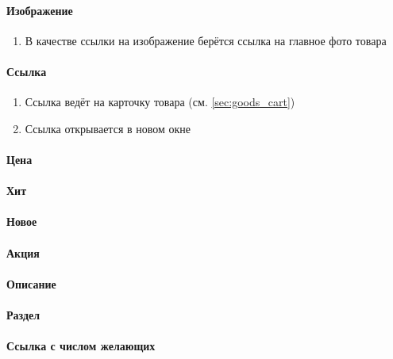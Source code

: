                \paragraph{Изображение}
                    \begin{enumerate}
                        \item В качестве ссылки на изображение берётся ссылка на главное фото товара
                    \end{enumerate}
                \paragraph{Ссылка}
                    \begin{enumerate}
                        \item Ссылка ведёт на карточку товара (см. \ref{sec:goods_cart})
                        \item Ссылка открывается в новом окне
                    \end{enumerate}
                \paragraph{Цена}
                \paragraph{Хит}
                \paragraph{Новое}
                \paragraph{Акция}
                \paragraph{Описание}
                \paragraph{Раздел}
                \paragraph{Ссылка с числом желающих}
            
